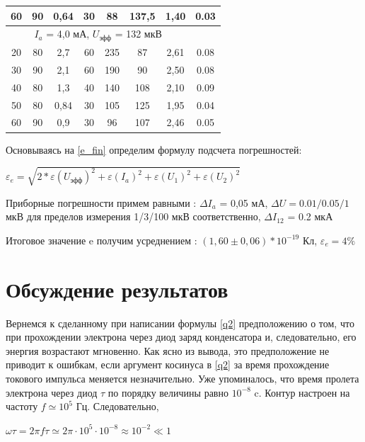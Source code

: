\documentclass[12pt,a4paper]{article}
\begin{document}
\begin{center}
\begin{tabular}{|c|c|c|c|c|c|c|c|}
\hline 
60 & 90 & 0,64 & 30 & 88 & 137,5 & 1,40 & 0.03 \\ 
\hline 
\multicolumn{7}{|c|}{$I_a$ = 4,0 мА, $U_\text{эфф}$ = 132 мкВ} \\ 
\hline 
20 & 80 & 2,7 & 60 & 235 & 87 & 2,61 & 0.08 \\ 
\hline 
30 & 90 & 2,1 & 60 & 190 & 90 & 2,50 & 0.08\\ 
\hline 
40 & 80 & 1,3 & 40 & 140 & 108 & 2,10 & 0.09\\ 
\hline 
50 & 80 & 0,84 & 30 & 105 & 125 & 1,95 & 0.04 \\ 
\hline 
60 & 90 & 0,9 & 30 & 96 & 107 & 2,46 & 0.05\\ 
\hline 
\end{tabular} 
\end{center}

Основываясь на \ref{e_fin} определим формулу подсчета погрешностей:

\begin{center}
$\varepsilon_{e} = \sqrt{2*\varepsilon({U_{\text{эфф}}})^2+\varepsilon({I_{a}})^2+\varepsilon({U_1})^2+\varepsilon({U_2})^2}$
\end{center}

Приборные погрешности примем равными : $\Delta{I_a}$ = 0,05 мА,  $\Delta{U} = 0.01/0.05/1$ мкВ для пределов измерения 1/3/100 мкВ соответственно, $\Delta{I_{12}}$ = 0.2 мкА

\par Итоговое значение e получим усреднением : $(1,60 \pm 0,06)*10^{-19}$ Кл, $\varepsilon_e = 4\%$ 

\section{Обсуждение результатов}


\par Вернемся к сделанному при написании формулы \ref{q2} предположению о том, что при прохождении электрона через диод заряд конденсатора и, следовательно, его энергия возрастают мгновенно. Как ясно из вывода, это предположение не приводит к ошибкам, если аргумент косинуса в \ref{q2} за время прохождение токового импульса меняется незначительно. Уже упоминалось, что время пролета электрона через диод $\tau$ по порядку величины равно $10^{-8}$ c. Контур настроен на частоту $f \simeq 10^5$ Гц. Следовательно, 

\begin{center}
$\omega\tau = 2\pi{f}\tau \simeq 2\pi\cdot{10^5}\cdot{10^{-8}} \approx 10^{-2} \ll 1$
\end{center}
\end{document}
